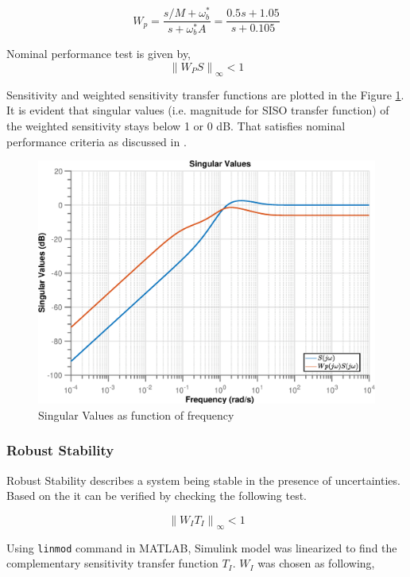 \documentclass[12pt]{article}
\newcommand{\norm}[1]{\left\lVert#1\right\rVert}
\begin{document}
	\begin{equation}
	W_p = \frac{s/M + \omega_b^*}{s + \omega_b^*A} = \frac{0.5 s +1.05 }{s + 0.105}
	\end{equation} 
	
	\noindent Nominal performance test is given by,
	\begin{equation}
	\norm{W_P S}_{\infty} < 1
	\end{equation}
	
	\noindent Sensitivity and weighted sensitivity transfer functions are plotted in the Figure \ref{fig:sigmafreqplotfors11}. It is evident that singular values (i.e. magnitude for SISO transfer function) of the weighted sensitivity stays below 1 or 0 dB. That satisfies nominal performance criteria as discussed in \cite{cite3}.
	
	\begin{figure}[H]
		\centering
		\includegraphics[width=0.8\linewidth]{sigmaFreqPlotForS11}
		\caption{Singular Values as function of frequency}
		\label{fig:sigmafreqplotfors11}
	\end{figure}
	
	\subsubsection{Robust Stability}
	Robust Stability describes a system being stable in the presence of uncertainties. Based on the \cite{cite3} it can be verified by checking the following test. 
	
	\begin{equation}
	\norm{W_I T_I}_{\infty} < 1
	\end{equation}
	
	\noindent Using \texttt{linmod} command in MATLAB, Simulink model was linearized to find the complementary sensitivity transfer function $T_I$. $W_I$ was chosen as following,
	
\end{document}
